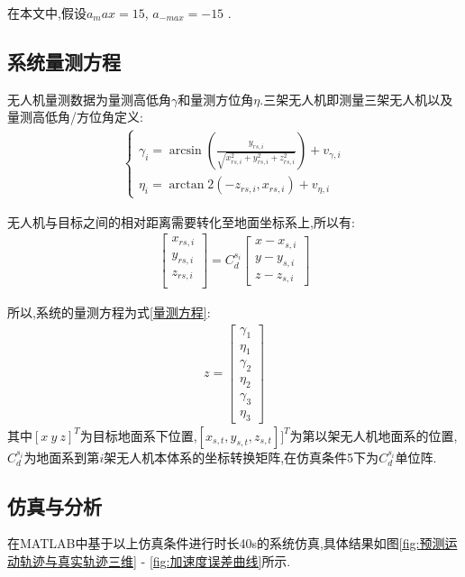 \documentclass[12pt]{article}
\numberwithin{equation}{section} %
\begin{document}
在本文中,假设$a_max = 15$, $a_{-max} = -15$ .
\subsection{系统量测方程}
无人机量测数据为量测高低角$\gamma$和量测方位角$\eta$.三架无人机即测量三架无人机以及
量测高低角/方位角定义:
\begin{align}
    \left\{\begin{array}{l}{{\gamma_{i}=\arcsin\left(\frac{\displaystyle y_{r s,i}}{\displaystyle\sqrt{x_{r s,i}^{2}+y_{r s,i}^{2}+z_{r s,i}^{2}}}\right)}} + v_{\gamma,i}\\ 
    {{\displaystyle\eta_{i}=\arctan2\left(-z_{r s,i},x_{r s,i}\right) + v_{\eta, i}}}\end{array}\right.
\end{align}

无人机与目标之间的相对距离需要转化至地面坐标系上,所以有:
\begin{align}
    \left[\begin{array}{c}{{x_{r s,i}}}\\ {{y_{r s,i}}}\\ {{z_{r s,i}}}\\ \end{array}\right]=C_{d}^{s_{i}}\left[\begin{array}{c}{{x-x_{s,i}}}\\ {{y-y_{s,i}}}\\ {{z-z_{s,i}}}\end{array}\right] 
\end{align}

所以,系统的量测方程为式\eqref{量测方程}:
\begin{align}
    z = 
    \left[\begin{array}{c}
     \gamma_1\\
     \eta_1\\
     \gamma_2\\
     \eta_2\\
     \gamma_3\\
     \eta_3
    \end{array}\right] \label{量测方程}
\end{align}
其中$[x~y~z]^T$为目标地面系下位置,$[x_{s,t}, y_{s,t}, z_{s,t}]]^T$为第以架无人机地面系的位置,$C_d^{s_i}$为地面系到第$i$架无人机本体系的坐标转换矩阵,在仿真条件5下为$C_d^{s_i}$单位阵.

\subsection{仿真与分析}
在MATLAB中基于以上仿真条件进行时长40s的系统仿真,具体结果如图\ref{fig:预测运动轨迹与真实轨迹三维} - \ref{fig:加速度误差曲线}所示.
\end{document}
